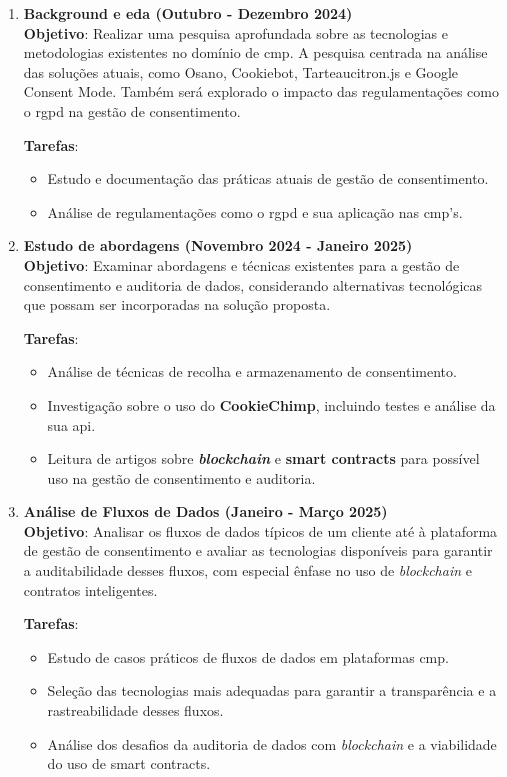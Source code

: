 \begin{enumerate} 
    \item \textbf{Background e \acrlong{eda} (Outubro - Dezembro 2024)} \\
    \textbf{Objetivo}: Realizar uma pesquisa aprofundada sobre as tecnologias e metodologias existentes no domínio de \acrfull{cmp}. A pesquisa centrada na análise das soluções atuais, como Osano, Cookiebot, Tarteaucitron.js e Google Consent Mode. Também será explorado o impacto das regulamentações como o \acrshort{rgpd} na gestão de consentimento.
    
    \textbf{Tarefas}:
    \begin{itemize}
        \item Estudo e documentação das práticas atuais de gestão de consentimento.
        \item Análise de regulamentações como o \acrshort{rgpd} e sua aplicação nas \acrshort{cmp}'s.
    \end{itemize}

    \item \textbf{Estudo de abordagens (Novembro 2024 - Janeiro 2025)} \\
    \textbf{Objetivo}: Examinar abordagens e técnicas existentes para a gestão de consentimento e auditoria de dados, considerando alternativas tecnológicas que possam ser incorporadas na solução proposta.
    
    \textbf{Tarefas}:
    \begin{itemize}
        \item Análise de técnicas de recolha e armazenamento de consentimento.
        \item Investigação sobre o uso do \textbf{CookieChimp}, incluindo testes e análise da sua \acrshort{api}.
        \item Leitura de artigos sobre \textbf{\textit{blockchain}} e \textbf{smart contracts} para possível uso na gestão de consentimento e auditoria.
    \end{itemize}

    \item \textbf{Análise de Fluxos de Dados (Janeiro - Março 2025)} \\
    \textbf{Objetivo}: Analisar os fluxos de dados típicos de um cliente até à plataforma de gestão de consentimento e avaliar as tecnologias disponíveis para garantir a auditabilidade desses fluxos, com especial ênfase no uso de \textit{blockchain} e contratos inteligentes.
    
    \textbf{Tarefas}:
    \begin{itemize}
        \item Estudo de casos práticos de fluxos de dados em plataformas \acrshort{cmp}.
        \item Seleção das tecnologias mais adequadas para garantir a transparência e a rastreabilidade desses fluxos.
        \item Análise dos desafios da auditoria de dados com \textit{blockchain} e a viabilidade do uso de smart contracts.
    \end{itemize}


\end{enumerate}
